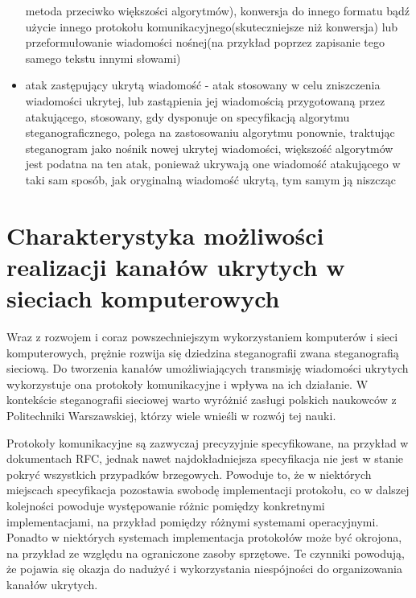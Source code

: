 \documentclass[a4paper, twoside, 12pt]{report}
\begin{document}
\begin{itemize}
                metoda przeciwko większości algorytmów), konwersja do innego formatu
                bądź użycie innego protokołu komunikacyjnego(skuteczniejsze niż konwersja) lub
                przeformułowanie wiadomości nośnej(na przykład poprzez zapisanie tego samego tekstu
                innymi słowami)
            \item atak zastępujący ukrytą wiadomość - atak stosowany w celu zniszczenia
                wiadomości ukrytej, lub zastąpienia jej wiadomością przygotowaną przez atakującego,
                stosowany, gdy dysponuje on specyfikacją algorytmu steganograficznego,
                polega na zastosowaniu algorytmu ponownie, traktując steganogram jako nośnik
                nowej ukrytej wiadomości, większość algorytmów jest podatna na ten
                atak, ponieważ ukrywają one wiadomość atakującego w taki sam sposób,
                jak oryginalną wiadomość ukrytą, tym samym ją niszcząc
        \end{itemize}


\chapter{Charakterystyka możliwości realizacji kanałów ukrytych w sieciach komputerowych}
    Wraz z rozwojem i coraz powszechniejszym wykorzystaniem komputerów i sieci
    komputerowych, prężnie rozwija się dziedzina steganografii zwana steganografią
    sieciową. Do tworzenia kanałów umożliwiających transmisję wiadomości ukrytych
    wykorzystuje ona protokoły komunikacyjne i wpływa na ich działanie. W kontekście
    steganografii sieciowej warto wyróżnić zasługi polskich naukowców z Politechniki
    Warszawskiej, którzy wiele wnieśli w rozwój tej nauki\cite{STEGANOGRAFIASIECIOWAART}.

    Protokoły komunikacyjne są zazwyczaj
    precyzyjnie specyfikowane, na przykład w dokumentach RFC, jednak nawet najdokładniejsza
    specyfikacja nie jest w stanie pokryć wszystkich przypadków brzegowych. Powoduje
    to, że w niektórych miejscach specyfikacja pozostawia swobodę implementacji protokołu,
    co w dalszej kolejności powoduje występowanie różnic pomiędzy konkretnymi
    implementacjami, na przykład pomiędzy różnymi systemami operacyjnymi. Ponadto
    w niektórych systemach implementacja protokołów może być okrojona, na przykład
    ze względu na ograniczone zasoby sprzętowe. Te czynniki
    powodują, że pojawia się okazja do nadużyć i wykorzystania niespójności do organizowania
    kanałów ukrytych.
\end{document}
